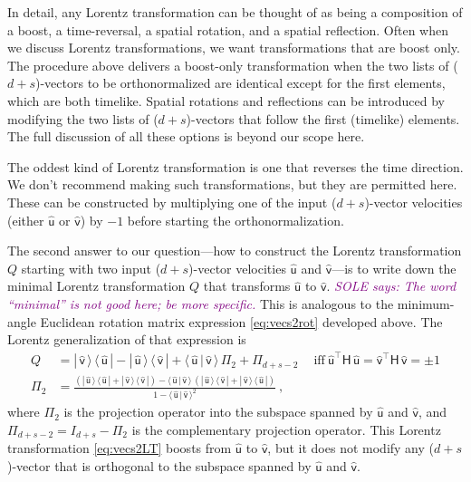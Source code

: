 \documentclass{article}
\newcommand{\metric}{\mathsf{H}}
\newcommand{\proj}{\mathsf{\Pi}}
\newcommand{\Lhat}[1]{\hat{\mathsf{#1}}} %
\newcommand{\braket}[2]{\langle\,{#1}\,|\,{#2}\,\rangle}
\newcommand{\ketbra}[2]{|\,{#1}\,\rangle\,\langle\,{#2}\,|}
\newcommand{\plus}{\!+\!} %
\newcommand{\SOLE}[1]{\textcolor{purple}{\textsl{SOLE says: {#1}}}}
\begin{document}
In detail, any Lorentz transformation can be thought of as being a composition of a boost, a time-reversal, a spatial rotation, and a spatial reflection.
Often when we discuss Lorentz transformations, we want transformations that are boost only.
The procedure above delivers a boost-only transformation when the two lists of ($d\plus s$)-vectors to be orthonormalized are identical except for the first elements, which are both timelike.
Spatial rotations and reflections can be introduced by modifying the two lists of ($d\plus s$)-vectors that follow the first (timelike) elements.
The full discussion of all these options is beyond our scope here.

The oddest kind of Lorentz transformation is one that reverses the time direction.
We don't recommend making such transformations, but they are permitted here.
These can be constructed by multiplying one of the input ($d\plus s$)-vector velocities (either $\Lhat{u}$ or $\Lhat{v}$) by $-1$ before starting the orthonormalization.

The second answer to our question---how to construct the Lorentz transformation $Q$ starting with two input ($d\plus s$)-vector velocities $\Lhat{u}$ and $\Lhat{v}$---is to write down the minimal Lorentz transformation $Q$ that transforms $\Lhat{u}$ to $\Lhat{v}$.
\SOLE{The word ``minimal'' is not good here; be more specific.}
This is analogous to the minimum-angle Euclidean rotation matrix expression \eqref{eq:vecs2rot} developed above.
The Lorentz generalization of that expression is
\begin{align}
    Q &= \ketbra{\Lhat{v}}{\Lhat{u}} - \ketbra{\Lhat{u}}{\Lhat{v}} + \braket{\Lhat{u}}{\Lhat{v}}\,\proj_{2} + \proj_{d+s-2} \quad~ \mbox{iff} ~ \Lhat{u}^\top\metric\,\Lhat{u} = \Lhat{v}^\top\metric\,\Lhat{v} = \pm 1 \label{eq:vecs2LT} \\
    \proj_{2} &= \frac{\left(\ketbra{\Lhat{u}}{\Lhat{u}} + \ketbra{\Lhat{v}}{\Lhat{v}}\right) - \braket{\Lhat{u}}{\Lhat{v}}\,\left(\ketbra{\Lhat{u}}{\Lhat{v}} + \ketbra{\Lhat{v}}{\Lhat{u}}\right)}{1 - \braket{\Lhat{u}}{\Lhat{v}}^2} ~,
\end{align}
where $\proj_{2}$ is the projection operator into the subspace spanned by $\Lhat{u}$ and $\Lhat{v}$,
and $\proj_{d+s-2} = I_{d+s} - \proj_{2}$ is the complementary projection operator.
This Lorentz transformation \eqref{eq:vecs2LT} boosts from $\Lhat{u}$ to $\Lhat{v}$, but it does not modify any ($d\plus s$)-vector that is orthogonal to the subspace spanned by $\Lhat{u}$ and $\Lhat{v}$.
\end{document}
